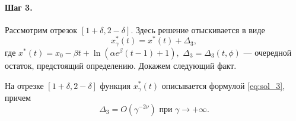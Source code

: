\paragraph{Шаг 3.} 
Рассмотрим отрезок $[1 + \delta, 2 - \delta]$. Здесь решение отыскивается в виде
\begin{equation}
	\label{eq:sol_3}
	x_\gamma^*(t) = x^*(t) + \Delta_3,
\end{equation}
где $x^*(t) = x_0 - \beta t +\ln(\alpha e^{\beta}(t - 1) + 1),$ $\Delta_3 = \Delta_3(t, \phi)$ --- очередной остаток, предстоящий определению. Докажем следующий факт.

\begin{lemma}
	\label{lm:Delta3}
	На отрезке $[1 + \delta, 2 - \delta]$ функция $x_\gamma^*(t)$ описывается формулой \eqref{eq:sol_3}, причем
	\[
	\Delta_3 = O(\gamma^{-2\nu}) \text{ при } \gamma \to +\infty.
	\]
\end{lemma}
